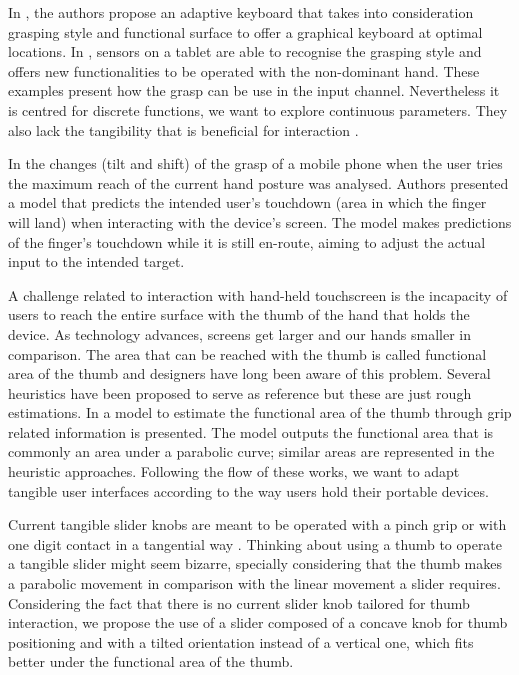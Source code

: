 \documentclass{sigchi}
\begin{document}
In \cite{Cheng:2013:IGA:2468356.2479514}, the authors propose an adaptive keyboard that takes into consideration grasping style and functional surface to offer a graphical keyboard at optimal locations. In \cite{Wagner:2012:BBD:2207676.2208391}, sensors on a tablet are able to recognise the grasping style and offers new functionalities to be operated with the non-dominant hand. These examples present how the grasp can be use in the input channel. Nevertheless it is centred for discrete functions, we want to explore continuous parameters. They also lack the tangibility that is beneficial for interaction \cite{unpublished,Jansen:2012:TRC:2207676.2208691}.  

In \cite{Negulescu:2015:GCI:2702123.2702185} the changes (tilt and shift) of the grasp of a mobile phone when the user tries the maximum reach of the current hand posture was analysed. Authors presented a model that predicts the intended user’s touchdown (area in which the finger will land) when interacting with the device’s screen. The model makes predictions of the finger’s touchdown while it is still en-route, aiming to adjust the actual input to the intended target.

A challenge related to interaction with hand-held touchscreen is the incapacity of users to reach the entire surface with the thumb of the hand that holds the device. As technology advances, screens get larger and our hands smaller in comparison. The area that can be reached with the thumb is called functional area of the thumb and designers have long been aware of this problem. Several heuristics have been proposed \cite{hoober13,Clark,Curtis,Wroblewski} to serve as reference but these are just rough estimations. In \cite{Bergstrom-Lehtovirta:2014:MFA:2611528.2557354} a model to estimate the functional area of the thumb through grip related information is presented. The model outputs the functional area that is commonly an area under a parabolic curve; similar areas are represented in the heuristic approaches. Following the flow of these works, we want to adapt tangible user interfaces according to the way users hold their portable devices.

Current tangible slider knobs are meant to be operated with a pinch grip or with one digit contact in a tangential way \cite{standrs}. Thinking about using a thumb to operate a tangible slider might seem bizarre, specially considering that the thumb makes a parabolic movement in comparison with the linear movement a slider requires. Considering the fact that there is no current slider knob tailored for thumb interaction, we propose the use of a slider composed of a concave knob for thumb positioning and with a tilted orientation instead of a vertical one, which fits better under the functional area of the thumb.
\end{document}
